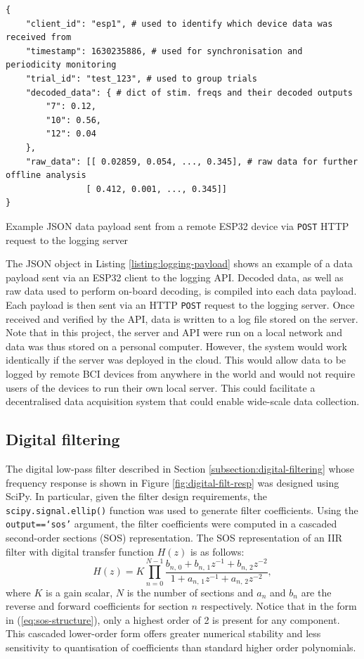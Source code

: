 \begin{listing}[h]
\small
\begin{verbatim}
{
    "client_id": "esp1", # used to identify which device data was received from
    "timestamp": 1630235886, # used for synchronisation and periodicity monitoring
    "trial_id": "test_123", # used to group trials 
    "decoded_data": { # dict of stim. freqs and their decoded outputs
        "7": 0.12,
        "10": 0.56, 
        "12": 0.04
    },
    "raw_data": [[ 0.02859, 0.054, ..., 0.345], # raw data for further offline analysis
                [ 0.412, 0.001, ..., 0.345]]
}
\end{verbatim}
\caption{Example JSON data payload sent from a remote ESP32 device via \texttt{POST} HTTP request to the logging server}
\label{listing:logging-payload}

\end{listing}
The JSON object in Listing \ref{listing:logging-payload} shows an example of a data payload sent via an ESP32 client to the logging API. Decoded data, as well as raw data used to perform on-board decoding, is compiled into each data payload. Each payload is then sent via an HTTP \texttt{POST} request to the logging server. Once received and verified by the API, data is written to a log file stored on the server. Note that in this project, the server and API were run on a local network and data was thus stored on a personal computer. However, the system would work identically if the server was deployed in the cloud. This would allow data to be logged by remote BCI devices from anywhere in the world and would not require users of the devices to run their own local server. This could facilitate a decentralised data acquisition system that could enable wide-scale data collection.  

\subsection{Digital filtering}
The digital low-pass filter described in Section \ref{subsection:digital-filtering} whose frequency response is shown in Figure \ref{fig:digital-filt-resp} was designed using SciPy. In particular, given the filter design requirements, the \texttt{scipy.signal.ellip()} function was used to generate filter coefficients. Using the \texttt{output==`sos'} argument, the filter coefficients were computed in a cascaded second-order sections (SOS) representation. The SOS representation of an IIR filter with digital transfer function $H(z)$ is as follows:
\begin{equation}
H(z)=K\prod_{n=0}^{N-1} \frac{b_{n,\, 0}+b_{n,\, 1} z^{-1}+b_{n,\, 2} z^{-2}}{1+a_{n,\, 1} z^{-1}+a_{n,\, 2}z^{-2}},
\label{eq:sos-structure}
\end{equation}
where $K$ is a gain scalar, $N$ is the number of sections and $a_n$ and $b_n$ are the reverse and forward coefficients for section $n$ respectively. Notice that in the form in (\ref{eq:sos-structure}), only a highest order of 2 is present for any component. This cascaded lower-order form offers greater numerical stability and less sensitivity to quantisation of coefficients than standard higher order polynomials.

